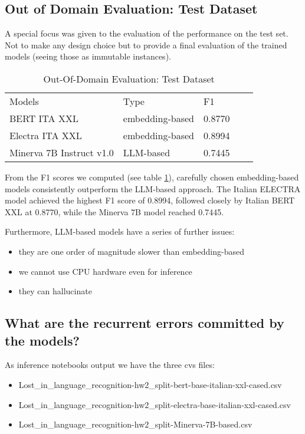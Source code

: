 \documentclass[11pt]{article}
\begin{document}
\subsection{Out of Domain Evaluation: Test Dataset}

A special focus was given to the evaluation of the performance on the test set.
Not to make any design choice but to provide a final evaluation of the 
trained models (seeing those as immutable instances).

\begin{table}[]
	\small
	\caption{Out-Of-Domain Evaluation: Test Dataset}
	\begin{tabular}{lllll}
		Models & Type & F1 \\
		BERT ITA XXL & embedding-based & 0.8770 \\
		Electra ITA XXL & embedding-based & 0.8994 \\
		Minerva 7B Instruct v1.0 & LLM-based & 0.7445 \\
	\end{tabular}
	\label{t3}
\end{table}

From the F1 scores we computed (see table \ref{t3}),
carefully chosen embedding-based models consistently outperform the LLM-based approach.
The Italian ELECTRA model achieved the highest F1 score of 0.8994, followed closely by Italian BERT XXL at 0.8770,
while the Minerva 7B model reached 0.7445.

Furthermore, LLM-based models have a series of further issues:

\begin{itemize}
 	\item they are one order of magnitude slower than embedding-based
	\item we cannot use CPU hardware even for inference
	\item they can hallucinate
\end{itemize}

\subsection{What are the recurrent errors committed by the models?}

As inference notebooks output we have the three cvs files:

\begin{itemize}
 	\item Lost\_in\_language\_recognition-hw2\_split-bert-base-italian-xxl-cased.csv
	\item Lost\_in\_language\_recognition-hw2\_split-electra-base-italian-xxl-cased.csv
	\item Lost\_in\_language\_recognition-hw2\_split-Minerva-7B-based.csv
\end{itemize}
\end{document}
